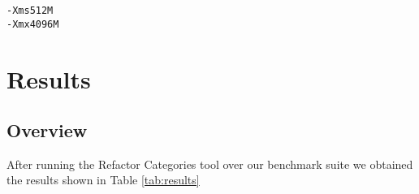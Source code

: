 \begin{verbatim}
-Xms512M 
-Xmx4096M
\end{verbatim}



% 
% 
% 



\section{Results}
\subsection{Overview}
After running the Refactor Categories tool over our benchmark suite we obtained the results shown in Table \ref{tab:results}



